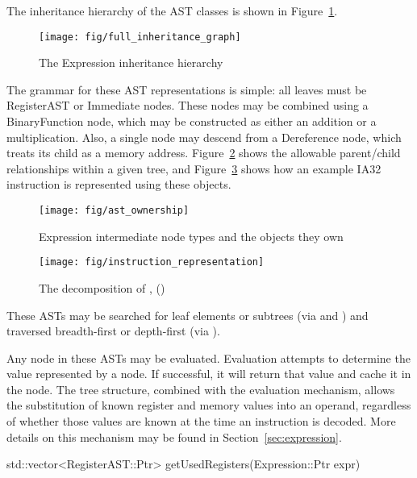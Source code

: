 The inheritance hierarchy of the AST classes is shown in
Figure~\ref{fig:inheritance}. 
\begin{figure}
    \centering
\texttt{[image: fig/full\_inheritance\_graph]}
\caption{The Expression inheritance hierarchy}
\label{fig:inheritance}
\end{figure}

The grammar for these AST representations is simple: all leaves must be
RegisterAST or Immediate nodes. These nodes may be combined using a
BinaryFunction node, which may be constructed as either an addition or a
multiplication. Also, a single node may descend from a Dereference node, which
treats its child as a memory address. Figure~\ref{fig:ownership} shows the allowable parent/child
relationships within a given tree, and Figure~\ref{fig:representation} shows how an example IA32
instruction is represented using these objects. 

\begin{figure}
    \centering
\texttt{[image: fig/ast\_ownership]}
\caption{Expression intermediate node types and the objects they own}
\label{fig:ownership}
\end{figure}
 
\begin{figure}
    \centering
\texttt{[image: fig/instruction\_representation]}
\caption{The decomposition of  , ()}
\label{fig:representation}
\end{figure}

These ASTs may be searched for leaf elements or subtrees (via 
 and ) and traversed breadth-\/first or depth-\/first
(via ).

Any node in these ASTs may be evaluated. Evaluation attempts to determine the
value represented by a node. If successful, it will return that value and cache
it in the node. The tree structure, combined with the evaluation mechanism,
allows the substitution of known register and memory values into an operand,
regardless of whether those values are known at the time an instruction is
decoded. More details on this mechanism may be found in
Section~\ref{sec:expression}.

\begin{apient}
std::vector<RegisterAST::Ptr> getUsedRegisters(Expression::Ptr expr)
\end{apient}

